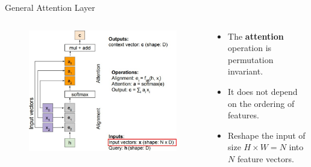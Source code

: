 \begin{frame}[allowframebreaks]{General Attention Layer}
    \begin{columns}
    \begin{column}{0.6\textwidth}
        \begin{figure}
            \flushleft
            \includegraphics[width=\linewidth,height=\textheight,keepaspectratio]{images/transformers/slide_35_1_img.jpg}
        \end{figure}
    \end{column}
    \begin{column}{0.4\textwidth}
        \begin{itemize}
            \item The \textbf{attention} operation is permutation invariant.
            \item It does not depend on the ordering of features.
            \item Reshape the input of size $H \times W = N$ into $N$ feature vectors.
        \end{itemize}
    \end{column}
    \end{columns}

    \framebreak


\end{frame}
